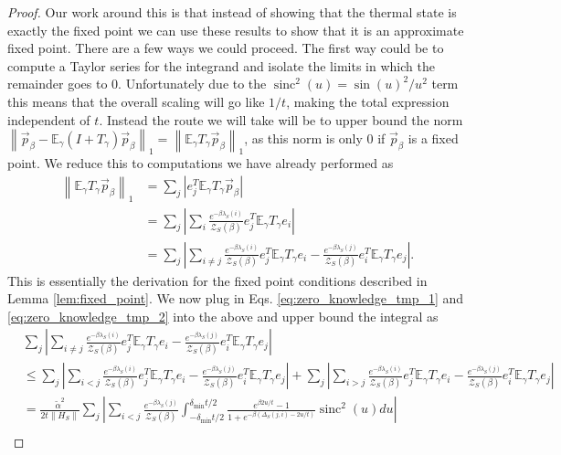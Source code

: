 \documentclass[
 amsmath,amssymb,
 aps,
onecolumn, 
nofootinbib]{revtex4-2}
\newcommand{\abs}[1]{\left| #1 \right|}
\newcommand{\norm}[1]{\left\| #1 \right\|}
\newcommand{\EE}{\mathbb{E}}
\newcommand{\partfun}{\mathcal{Z}}
\DeclareMathOperator{\sinc}{sinc}
\begin{document}
\begin{proof}
    Our work around this is that instead of showing that the thermal state is exactly the fixed point we can use these results to show that it is an approximate fixed point. There are a few ways we could proceed. The first way could be to compute a Taylor series for the integrand and isolate the limits in which the remainder goes to 0. Unfortunately due to the $\sinc^2(u) = \sin(u)^2 / u^2$ term this means that the overall scaling will go like $1/t$, making the total expression independent of $t$. Instead the route we will take will be to upper bound the norm $\norm{\vec{p}_{\beta} - \EE_\gamma (I + T_\gamma)\vec{p}_\beta}_1 = \norm{\EE_\gamma T_\gamma \vec{p}_\beta}_1$, as this norm is only 0 if $\vec{p}_\beta$ is a fixed point. We reduce this to computations we have already performed as
    \begin{align}
        \norm{\EE_\gamma T_\gamma \vec{p}_\beta}_1 &= \sum_j \abs{e_j^T \EE_\gamma T_\gamma \vec{p}_\beta } \\
        &= \sum_j \abs{\sum_{i} \frac{e^{-\beta \lambda_S(i)}}{\partfun_S(\beta)} e_j^T \EE_\gamma T_\gamma e_i } \\
        &= \sum_j \abs{\sum_{i \neq j} \frac{e^{-\beta \lambda_S(i)}}{\partfun_S(\beta)} e_j^T \EE_\gamma T_\gamma e_i - \frac{e^{-\beta \lambda_S(j)}}{\partfun_S(\beta)} e_i^T \EE_\gamma T_\gamma e_j}.
    \end{align}
    This is essentially the derivation for the fixed point conditions described in Lemma \ref{lem:fixed_point}. We now plug in Eqs. \eqref{eq:zero_knowledge_tmp_1} and \eqref{eq:zero_knowledge_tmp_2} into the above and upper bound the integral as
    \begin{align}
        &\sum_j \abs{\sum_{i \neq j} \frac{e^{-\beta \lambda_S(i)}}{\partfun_S(\beta)} e_j^T \EE_\gamma T_\gamma e_i - \frac{e^{-\beta \lambda_S(j)}}{\partfun_S(\beta)} e_i^T \EE_\gamma T_\gamma e_j} \nonumber \\
        &\le \sum_j \abs{\sum_{i < j} \frac{e^{-\beta \lambda_S(i)}}{\partfun_S(\beta)} e_j^T \EE_\gamma T_\gamma e_i - \frac{e^{-\beta \lambda_S(j)}}{\partfun_S(\beta)} e_i^T \EE_\gamma T_\gamma e_j} + \sum_j  \abs{\sum_{i > j} \frac{e^{-\beta \lambda_S(i)}}{\partfun_S(\beta)} e_j^T \EE_\gamma T_\gamma e_i - \frac{e^{-\beta \lambda_S(j)}}{\partfun_S(\beta)} e_i^T \EE_\gamma T_\gamma e_j} \\
        &= \frac{\widetilde{\alpha}^2}{2 t \norm{H_S}} \sum_j \abs{\sum_{i < j} \frac{e^{-\beta \lambda_S(j)}}{\partfun_S(\beta)} \int_{-\delta_{\min} t /2 }^{\delta_{\min} t/ 2} \frac{ e^{\beta 2 u / t} - 1}{1 + e^{-\beta(\Delta_S(j, i) - 2u/t)}} \sinc^2(u) du} \nonumber \\

\end{align}
\end{proof}
\end{document}
